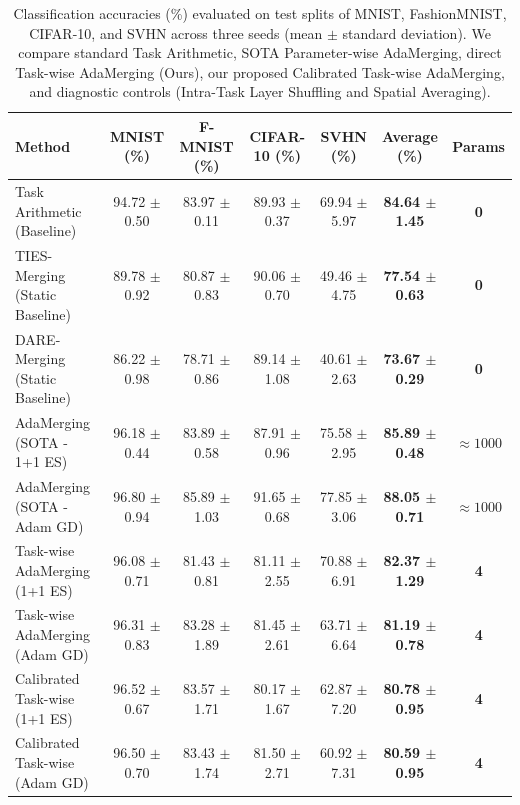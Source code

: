 \begin{table}[t]
\caption{Classification accuracies (\%) evaluated on test splits of MNIST, FashionMNIST, CIFAR-10, and SVHN across three seeds (mean $\pm$ standard deviation). We compare standard Task Arithmetic, SOTA Parameter-wise AdaMerging, direct Task-wise AdaMerging (Ours), our proposed Calibrated Task-wise AdaMerging, and diagnostic controls (Intra-Task Layer Shuffling and Spatial Averaging).}
\label{tab:accuracies}
\vskip 0.15in
\begin{center}
\begin{footnotesize}
\begin{sc}
\setlength{\tabcolsep}{2.1pt}
\begin{tabular}{lcccccc}
\toprule
Method & MNIST (\%) & F-MNIST (\%) & CIFAR-10 (\%) & SVHN (\%) & Average (\%) & Params \\
\midrule
Task Arithmetic (Baseline) & 94.72 $\pm$ 0.50 & 83.97 $\pm$ 0.11 & 89.93 $\pm$ 0.37 & 69.94 $\pm$ 5.97 & \textbf{84.64 $\pm$ 1.45} & \textbf{0} \\
TIES-Merging (Static Baseline) & 89.78 $\pm$ 0.92 & 80.87 $\pm$ 0.83 & 90.06 $\pm$ 0.70 & 49.46 $\pm$ 4.75 & \textbf{77.54 $\pm$ 0.63} & \textbf{0} \\
DARE-Merging (Static Baseline) & 86.22 $\pm$ 0.98 & 78.71 $\pm$ 0.86 & 89.14 $\pm$ 1.08 & 40.61 $\pm$ 2.63 & \textbf{73.67 $\pm$ 0.29} & \textbf{0} \\
\midrule
AdaMerging (SOTA - 1+1 ES) & 96.18 $\pm$ 0.44 & 83.89 $\pm$ 0.58 & 87.91 $\pm$ 0.96 & 75.58 $\pm$ 2.95 & \textbf{85.89 $\pm$ 0.48} & $\approx 1000$ \\
AdaMerging (SOTA - Adam GD) & 96.80 $\pm$ 0.94 & 85.89 $\pm$ 1.03 & 91.65 $\pm$ 0.68 & 77.85 $\pm$ 3.06 & \textbf{88.05 $\pm$ 0.71} & $\approx 1000$ \\
\midrule
Task-wise AdaMerging (1+1 ES) & 96.08 $\pm$ 0.71 & 81.43 $\pm$ 0.81 & 81.11 $\pm$ 2.55 & 70.88 $\pm$ 6.91 & \textbf{82.37 $\pm$ 1.29} & \textbf{4} \\
Task-wise AdaMerging (Adam GD) & 96.31 $\pm$ 0.83 & 83.28 $\pm$ 1.89 & 81.45 $\pm$ 2.61 & 63.71 $\pm$ 6.64 & \textbf{81.19 $\pm$ 0.78} & \textbf{4} \\
\midrule
Calibrated Task-wise (1+1 ES) & 96.52 $\pm$ 0.67 & 83.57 $\pm$ 1.71 & 80.17 $\pm$ 1.67 & 62.87 $\pm$ 7.20 & \textbf{80.78 $\pm$ 0.95} & \textbf{4} \\
Calibrated Task-wise (Adam GD) & 96.50 $\pm$ 0.70 & 83.43 $\pm$ 1.74 & 81.50 $\pm$ 2.71 & 60.92 $\pm$ 7.31 & \textbf{80.59 $\pm$ 0.95} & \textbf{4} \\

\end{tabular}
\end{sc}
\end{footnotesize}
\end{center}
\end{table}
